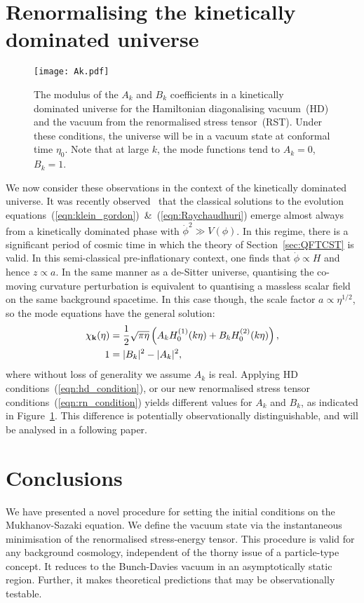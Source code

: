 \section{Renormalising the kinetically dominated universe}
\begin{figure}                   
  \centering
  \texttt{[image: Ak.pdf]}
  \caption{The modulus of the $A_k$ and $B_k$ coefficients in a kinetically dominated universe for the Hamiltonian diagonalising vacuum~(HD) and the vacuum from the renormalised stress tensor~(RST). Under these conditions, the universe will be in a vacuum state at conformal time $\eta_0$. Note that at large $k$, the mode functions tend to $A_k=0$, $B_k=1$.\label{fig:Ak}}
\end{figure}
We now consider these observations in the context of the kinetically dominated universe. 
It was recently observed~\cite{Handley+2014} that the classical solutions to the evolution equations~(\ref{eqn:klein_gordon})~\&~(\ref{eqn:Raychaudhuri}) emerge almost always from a kinetically dominated phase with $\dot{\phi}^2\gg V(\phi)$. 
In this regime, there is a significant period of cosmic time in which the theory of Section~\ref{sec:QFTCST} is valid. 
In this semi-classical pre-inflationary context, one finds that $\dot{\phi}\propto H$ and hence ${z\propto a}$. 
In the same manner as a de-Sitter universe, quantising the co-moving curvature perturbation is equivalent to quantising a massless scalar field on the same background spacetime. 
In this case though, the scale factor ${a \propto \eta^{1/2}}$, so the mode equations have the general solution:
\begin{align}
  \chi_{\mathbf{k}}(\eta) &= \frac{1}{2}\sqrt{\pi\eta}\left( A_k H_{0}^{(1)}(k\eta) + B_k H_{0}^{(2)}(k\eta) \right), \nonumber \\
  1&=|B_k|^2 - |A_k|^2, \label{eqn:kd_modes} 
\end{align}
where without loss of generality we assume $A_k$ is real.
Applying HD conditions~(\ref{eqn:hd_condition}), or our new renormalised stress tensor conditions~(\ref{eqn:rn_condition}) yields different values for $A_k$ and $B_k$, as indicated in Figure~\ref{fig:Ak}. This difference is potentially observationally distinguishable, and will be analysed in a following paper.


\section{Conclusions}
We have presented a novel procedure for setting the initial conditions on the Mukhanov-Sazaki equation. We define the vacuum state via the instantaneous minimisation of the renormalised stress-energy tensor. This procedure is valid for any background cosmology, independent of the thorny issue of a particle-type concept. It reduces to the Bunch-Davies vacuum in an asymptotically static region. Further, it makes theoretical predictions that may be observationally testable.



